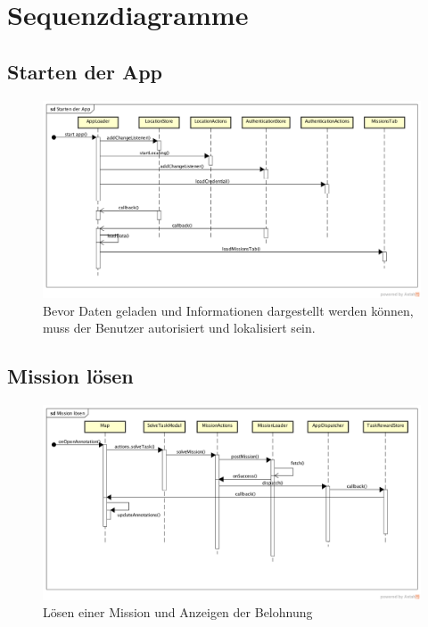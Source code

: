 \label{pd-sequenzdiagramme}
\section{Sequenzdiagramme}
\subsection{Starten der App}
\begin{figure}[H]
 	\centering
 	\includegraphics[width=\textwidth]{images/projektdokumentation/sd-app-start.png}
 	\caption{Bevor Daten geladen und Informationen dargestellt werden können, muss der Benutzer autorisiert und lokalisiert sein.}
 	\label{image-sd-start-app}
\end{figure}

\subsection{Mission lösen}
\label{pd-sequenzdiagramme-mission}
\begin{figure}[H]
 	\centering
 	\includegraphics[width=\textwidth]{images/projektdokumentation/sd-mission-loesen.png}
 	\caption{Lösen einer Mission und Anzeigen der Belohnung}
 	\label{image-sd-solve-mission}
\end{figure}